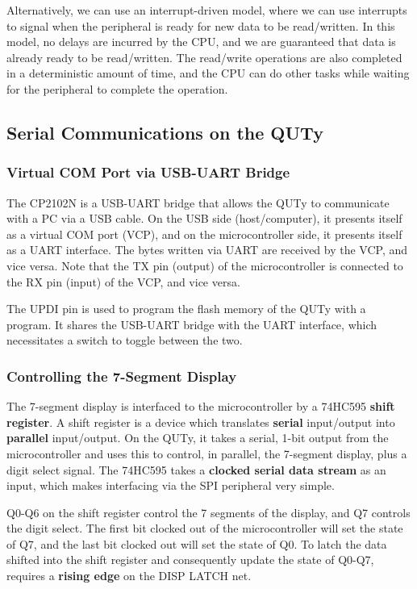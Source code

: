 \documentclass{article}
\begin{document}
Alternatively, we can use an interrupt-driven model, where we can use
interrupts to signal when the peripheral is ready for new data to be
read/written. In this model, no delays are incurred by the CPU, and we
are guaranteed that data is already ready to be read/written. The
read/write operations are also completed in a deterministic amount of
time, and the CPU can do other tasks while waiting for the peripheral
to complete the operation.
\subsection{Serial Communications on the QUTy}
\subsubsection{Virtual COM Port via USB-UART Bridge}
The CP2102N is a USB-UART bridge that allows the QUTy to communicate
with a PC via a USB cable. On the USB side (host/computer), it presents
itself as a virtual COM port (VCP), and on the microcontroller side, it
presents itself as a UART interface. The bytes written via UART are
received by the VCP, and vice versa. Note that the TX pin (output) of
the microcontroller is connected to the RX pin (input) of the VCP, and
vice versa.

The UPDI pin is used to program the flash memory of the QUTy with a
program. It shares the USB-UART bridge with the UART interface, which
necessitates a switch to toggle between the two.
\subsubsection{Controlling the 7-Segment Display}
The 7-segment display is interfaced to the microcontroller by a 74HC595
\textbf{shift register}. A shift register is a device which translates
\textbf{serial} input/output into \textbf{parallel} input/output. On
the QUTy, it takes a serial, 1-bit output from the microcontroller and
uses this to control, in parallel, the 7-segment display, plus a digit
select signal. The 74HC595 takes a \textbf{clocked serial data stream}
as an input, which makes interfacing via the SPI peripheral very
simple.

Q0-Q6 on the shift register control the 7 segments of the display, and
Q7 controls the digit select. The first bit clocked out of the
microcontroller will set the state of Q7, and the last bit clocked out
will set the state of Q0. To latch the data shifted into the shift
register and consequently update the state of Q0-Q7, requires a
\textbf{rising edge} on the DISP LATCH net.
\end{document}
